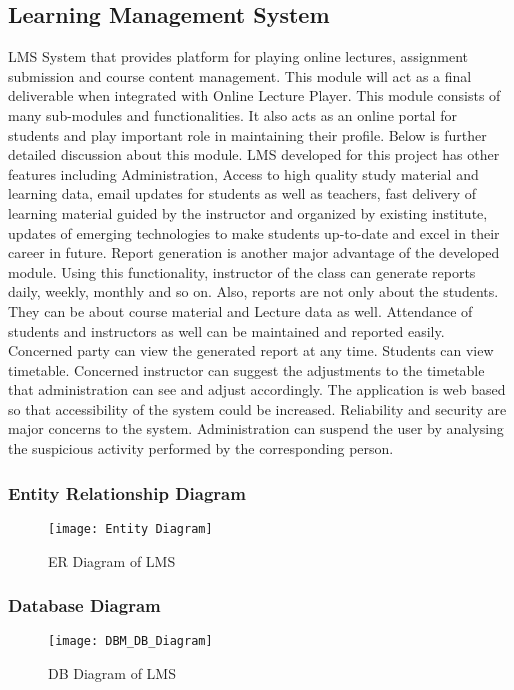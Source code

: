 \subsection{Learning Management System}
LMS System that provides platform for playing online lectures, assignment submission and course content management. This module will act as a final deliverable when integrated with Online Lecture Player. This module consists of many sub-modules and functionalities. It also acts as an online portal for students and play important role in maintaining their profile. Below is further detailed discussion about this module. LMS developed for this project has other features including Administration, Access to high quality study material and learning data, email updates for students as well as teachers, fast delivery of learning material guided by the instructor and organized by existing institute, updates of emerging technologies to make students up-to-date and excel in their career in future. Report generation is another major advantage of the developed module. Using this functionality, instructor of the class can generate reports daily, weekly, monthly and so on. Also, reports are not only about the students. They can be about course material and Lecture data as well. Attendance of students and instructors as well can be maintained and reported easily. Concerned party can view the generated report at any time. Students can view timetable. Concerned instructor can suggest the adjustments to the timetable that administration can see and adjust accordingly. The application is web based so that accessibility of the system could be increased. Reliability and security are major concerns to the system. Administration can suspend the user by analysing the suspicious activity performed by the corresponding person.
\subsubsection{Entity Relationship Diagram}
\begin{figure}[h]
  \centering
  \texttt{[image: Entity Diagram]}
  \caption{ER Diagram of LMS}
\end{figure}
\newpage


\subsubsection{Database Diagram}
\begin{figure}[h]
  \centering
  \texttt{[image: DBM\_DB\_Diagram]}
  \caption{DB Diagram of LMS}
\end{figure}

























